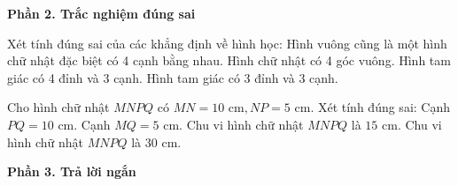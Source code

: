 \textbf{Phần 2. Trắc nghiệm đúng sai}

\begin{ex} %
Xét tính đúng sai của các khẳng định về hình học:
\choiceTF
{\True Hình vuông cũng là một hình chữ nhật đặc biệt có 4 cạnh bằng nhau.}
{\True Hình chữ nhật có 4 góc vuông.}
{Hình tam giác có 4 đỉnh và 3 cạnh.}
{\True Hình tam giác có 3 đỉnh và 3 cạnh.}
\end{ex}

\begin{ex} %
Cho hình chữ nhật $MNPQ$ có $MN = 10\text{ cm}, NP = 5\text{ cm}$. Xét tính đúng sai:
\choiceTF
{\True Cạnh $PQ = 10\text{ cm}$.}
{\True Cạnh $MQ = 5\text{ cm}$.}
{Chu vi hình chữ nhật $MNPQ$ là $15\text{ cm}$.}
{\True Chu vi hình chữ nhật $MNPQ$ là $30\text{ cm}$.}
\end{ex}

\textbf{Phần 3. Trả lời ngắn}

